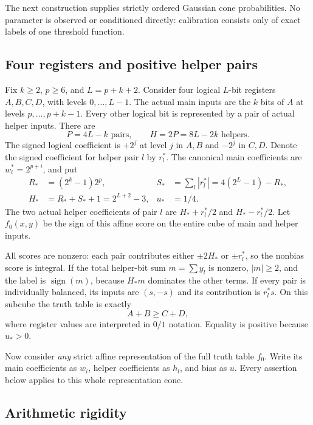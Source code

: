 \documentclass[11pt]{article}
\newcommand{\sgn}{\operatorname{sign}}
\begin{document}
The next construction supplies strictly ordered Gaussian cone
probabilities. No parameter is observed or conditioned directly:
calibration consists only of exact labels of one threshold function.

\subsection{Four registers and positive helper pairs}

Fix $k\ge2$, $p\ge6$, and $L=p+k+2$. Consider four logical $L$-bit
registers $A,B,C,D$, with levels $0,\ldots,L-1$. The actual main inputs
are the $k$ bits of $A$ at levels $p,\ldots,p+k-1$.
Every other logical bit is represented by a pair of actual helper inputs.
There are
\begin{equation}\label{eq:dimensions}
 P=4L-k\text{ pairs},\qquad H=2P=8L-2k\text{ helpers}.
\end{equation}
The signed logical coefficient is $+2^j$ at level $j$ in $A,B$ and
$-2^j$ in $C,D$. Denote the signed coefficient for helper pair $l$ by
$r_l^*$. The canonical main coefficients are $w_i^*=2^{p+i}$, and put
\begin{align}\label{eq:canonical}
 R_*&=(2^k-1)2^p,&
 S_*&=\sum_l|r_l^*|=4(2^L-1)-R_*,\\
 H_*&=R_*+S_*+1=2^{L+2}-3,& u_*&=1/4.\nonumber
\end{align}
The two actual helper coefficients of pair $l$ are
$H_*+r_l^*/2$ and $H_*-r_l^*/2$.
Let $f_0(x,y)$ be the sign of this affine score on the entire cube of
main and helper inputs.

All scores are nonzero: each pair contributes either $\pm2H_*$ or
$\pm r_l^*$, so the nonbias score is integral. If the total helper-bit
sum $m=\sum y_l$ is nonzero, $|m|\ge2$, and the label is $\sgn(m)$,
because $H_*m$ dominates the other terms. If every pair is individually
balanced, its inputs are $(s,-s)$ and its contribution is $r_l^*s$.
On this subcube the truth table is exactly
\begin{equation}\label{eq:addition}
 A+B\ge C+D,
\end{equation}
where register values are interpreted in $0/1$ notation. Equality is
positive because $u_*>0$.

Now consider \emph{any} strict affine representation of the full truth
table $f_0$. Write its main coefficients as $w_i$, helper coefficients
as $h_l$, and bias as $u$. Every assertion below applies to this whole
representation cone.

\subsection{Arithmetic rigidity}
\end{document}

